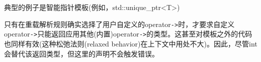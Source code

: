 \begin{notice}
典型的例子是智能指针模板(例如，std::unique\_ptr<T>)
\end{notice}

只有在重载解析规则确实选择了用户自定义的operator\texttt{->}时，才要求自定义operator\texttt{->}只能返回应用其他(内置)operator\texttt{->}的类型。这甚至对模板之外的代码也同样有效(这种松弛法则(relaxed behavior)在上下文中用处不大)。因此，尽管int会替代该返回类型，但这里的声明不会触发错误。






































